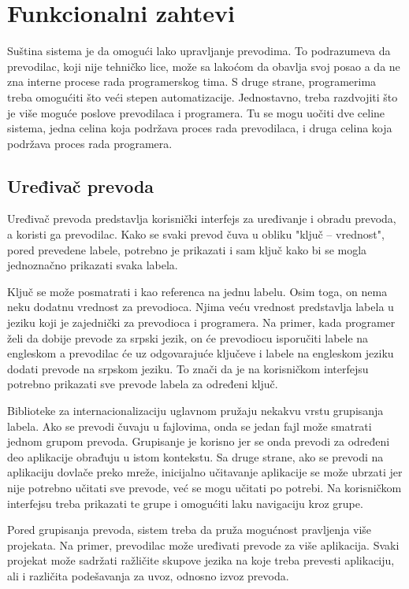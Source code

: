 \chapter{Funkcionalni zahtevi}\label{ch:funkcionalni_zahtevi}

Suština sistema je da omogući lako upravljanje prevodima. To podrazumeva da prevodilac, koji nije tehničko 
lice, može sa lakoćom da obavlja svoj posao a da ne zna interne procese rada programerskog tima. S druge
strane, programerima treba omogućiti što veći stepen automatizacije. Jednostavno, treba razdvojiti što je
više moguće poslove prevodilaca i programera. Tu se mogu uočiti dve celine sistema, jedna celina koja podržava
proces rada prevodilaca, i druga celina koja podržava proces rada programera.


\section{Uređivač prevoda}\label{sec:funkcionalni_zahtevi-uredjivac_prevoda}

Uređivač prevoda predstavlja korisnički interfejs za uređivanje i obradu prevoda, a koristi ga prevodilac.
Kako se svaki prevod čuva u obliku "ključ -- vrednost", pored prevedene labele, potrebno je prikazati i sam 
ključ kako bi se mogla jednoznačno prikazati svaka labela. 

Ključ se može posmatrati i kao referenca na jednu labelu. Osim toga, on nema neku dodatnu vrednost za prevodioca.
Njima veću vrednost predstavlja labela u jeziku koji je zajednički za prevodioca i programera. Na primer, kada 
programer želi da dobije prevode za srpski jezik, on će prevodiocu isporučiti labele na engleskom a prevodilac 
će uz odgovarajuće ključeve i labele na engleskom jeziku dodati prevode na srpskom jeziku. To znači da je na 
korisničkom interfejsu potrebno prikazati sve prevode labela za određeni ključ.

Biblioteke za internacionalizaciju uglavnom pružaju nekakvu vrstu grupisanja labela. Ako se prevodi čuvaju u 
fajlovima, onda se jedan fajl može smatrati jednom grupom prevoda. Grupisanje je korisno jer se onda prevodi 
za određeni deo aplikacije obrađuju u istom kontekstu. Sa druge strane, ako se prevodi na aplikaciju dovlače 
preko mreže, inicijalno učitavanje aplikacije se može ubrzati jer nije potrebno učitati sve prevode, već se 
mogu učitati po potrebi. Na korisničkom interfejsu treba prikazati te grupe i omogućiti laku navigaciju kroz
grupe.

Pored grupisanja prevoda, sistem treba da pruža mogućnost pravljenja više projekata. Na primer, prevodilac 
može uređivati prevode za više aplikacija. Svaki projekat može sadržati ražličite skupove jezika na koje 
treba prevesti aplikaciju, ali i različita podešavanja za uvoz, odnosno izvoz prevoda.


